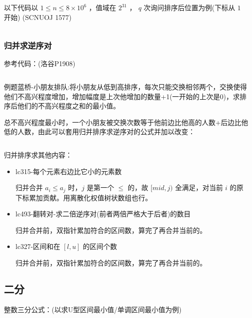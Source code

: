 \documentclass[twocolumn,10pt]{ctexart}
\begin{document}
以下代码以 $1\le n\le8\times 10^6$ ，值域在 $2^{31}$ ， $q$ 次询问排序后位置为例(下标从 $1$ 开始) (SCNUOJ 1577)

\inputminted{cpp}{code/ext_065.cpp}

\subsubsection{归并求逆序对}

参考代码：(洛谷P1908)

\inputminted{cpp}{code/p1908_mergesort.cpp}

\begin{notebox}
例题蓝桥-小朋友排队:将小朋友从低到高排序，每次只能交换相邻两个，交换使得他们不高兴程度增加，增加幅度是上次他增加的数量+1(一开始的上次是0)，求排序后他们的不高兴程度之和的最小值。
\end{notebox}

总不高兴程度最小时，一个小朋友被交换次数等于他前边比他高的人数+后边比他低的人数，由此可以套用归并排序求逆序对的公式并加以改变：

\inputminted{cpp}{code/eg_mergesort.cpp}

归并排序求其他内容：

\begin{itemize}
\item lc315-每个元素右边比它小的元素数

归并合并 $a_i\le a_j$ 时，$j$ 是第一个 $\le$ 的，故 $[mid,j)$ 全满足，对当前 $i$ 的原下标累加贡献。用离散化权值树状数组也行。
\end{itemize}

\begin{itemize}
\item lc493-翻转对-求二倍逆序对(前者两倍严格大于后者)的数目

归并合并前，双指针累加符合的区间数，算完了再合并当前的。
\end{itemize}

\begin{itemize}
\item lc327-区间和在 $[l,u]$ 的区间个数

归并合并前，双指针累加符合的区间数，算完了再合并当前的。
\end{itemize}

\subsection{二分}

整数三分公式：(以求U型区间最小值/单调区间最小值为例)
\end{document}
